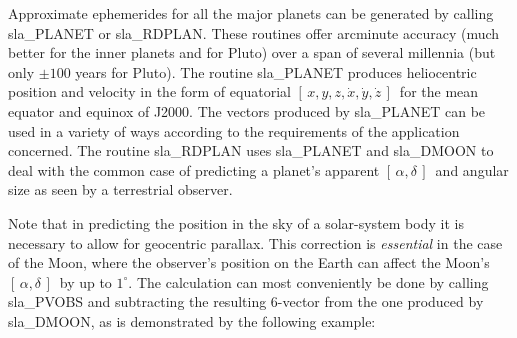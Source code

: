 \documentclass[11pt,twoside,nolof]{starlink}
\providecommand{\radec}     {$[\,\alpha,\delta\,]$}
\providecommand{\xyzxyzd}   {$[\,x,y,z,\dot{x},\dot{y},\dot{z}\,]$}
\begin{document}
Approximate ephemerides for all the major planets
can be generated by calling
sla\_PLANET
or
sla\_RDPLAN.  These routines offer arcminute accuracy (much
better for the inner planets and for Pluto) over a span of several
millennia (but only $\pm100$ years for Pluto).
The routine
sla\_PLANET produces heliocentric position and
velocity in the form of equatorial \xyzxyzd\ for the
mean equator and equinox of J2000.  The vectors
produced by
sla\_PLANET
can be used in a variety of ways according to the
requirements of the application concerned.  The routine
sla\_RDPLAN
uses
sla\_PLANET
and
sla\_DMOON
to deal with the common case of predicting
a planet's apparent \radec\ and angular size as seen by a
terrestrial observer.

Note that in predicting the position in the sky of a solar-system body
it is necessary to allow for geocentric parallax.  This correction
is \textit{essential}\/ in the case of the Moon, where the observer's
position on the Earth can affect the Moon's \radec\ by up to
$1^\circ$.  The calculation can most conveniently be done by calling
sla\_PVOBS and subtracting the resulting 6-vector from the
one produced by
sla\_DMOON, as is demonstrated by the following example:
\goodbreak
\end{document}
